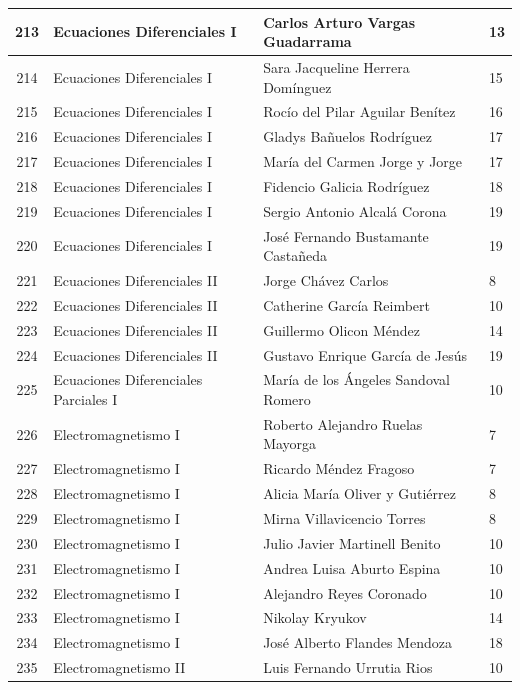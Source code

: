 {\begin{longtable}{|c|p{6.5cm}|p{5cm}|p{1.5cm}|}
  213 & Ecuaciones Diferenciales I & Carlos Arturo Vargas Guadarrama & 13 \\ \hline
  214 & Ecuaciones Diferenciales I & Sara Jacqueline Herrera Domínguez & 15 \\ \hline
  215 & Ecuaciones Diferenciales I & Rocío del Pilar Aguilar Benítez & 16 \\ \hline
  216 & Ecuaciones Diferenciales I & Gladys Bañuelos Rodríguez & 17 \\ \hline
  217 & Ecuaciones Diferenciales I & María del Carmen Jorge y Jorge & 17 \\ \hline
  218 & Ecuaciones Diferenciales I & Fidencio Galicia Rodríguez & 18 \\ \hline
  219 & Ecuaciones Diferenciales I & Sergio Antonio Alcalá Corona & 19 \\ \hline
  220 & Ecuaciones Diferenciales I & José Fernando Bustamante Castañeda & 19 \\ \hline
  221 & Ecuaciones Diferenciales II & Jorge Chávez Carlos & 8 \\ \hline
  222 & Ecuaciones Diferenciales II & Catherine García Reimbert & 10 \\ \hline
  223 & Ecuaciones Diferenciales II & Guillermo Olicon Méndez & 14 \\ \hline
  224 & Ecuaciones Diferenciales II & Gustavo Enrique García de Jesús & 19 \\ \hline
  225 & Ecuaciones Diferenciales Parciales I & María de los Ángeles Sandoval Romero & 10 \\ \hline
  226 & Electromagnetismo I & Roberto Alejandro Ruelas Mayorga & 7 \\ \hline
  227 & Electromagnetismo I & Ricardo Méndez Fragoso & 7 \\ \hline
  228 & Electromagnetismo I & Alicia María Oliver y Gutiérrez & 8 \\ \hline
  229 & Electromagnetismo I & Mirna Villavicencio Torres & 8 \\ \hline
  230 & Electromagnetismo I & Julio Javier Martinell Benito & 10 \\ \hline
  231 & Electromagnetismo I & Andrea Luisa Aburto Espina & 10 \\ \hline
  232 & Electromagnetismo I & Alejandro Reyes Coronado & 10 \\ \hline
  233 & Electromagnetismo I & Nikolay Kryukov & 14 \\ \hline
  234 & Electromagnetismo I & José Alberto Flandes Mendoza & 18 \\ \hline
  235 & Electromagnetismo II & Luis Fernando Urrutia Rios & 10 \\ \hline

\end{longtable}}
